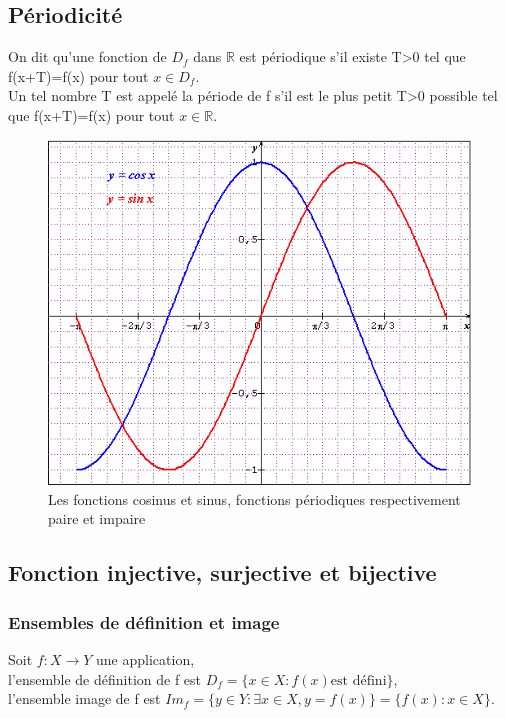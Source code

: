 \documentclass[a4paper,10pt]{book}
\begin{document}
\subsection{Périodicité}
On dit qu'une fonction de $D_{f}$ dans $\mathbb{R}$ est périodique s'il existe T>0 tel que f(x+T)=f(x) pour tout $x \in D_{f}$.\\
Un tel nombre T est appelé la période de f s'il est le plus petit T>0 possible tel que f(x+T)=f(x) pour tout $x \in \mathbb{R}$.\\
\begin{figure}[h]
\begin{center}
\includegraphics[scale=0.3]{images/001.png}
\caption{Les fonctions cosinus et sinus, fonctions périodiques respectivement paire et impaire}
\end{center}
\end{figure}

\subsection{Fonction injective, surjective et bijective}
\subsubsection{Ensembles de définition et image}
Soit $f: X \longrightarrow Y$ une application,\\
l'ensemble de définition de f est $D_{f}=\{x \in X : f(x) \text{est défini}\}$,\\
l'ensemble image de f est $Im_{f}=\{y \in Y : \exists x \in X, y=f(x) \}=\{f(x) : x \in X \}$.
\end{document}
